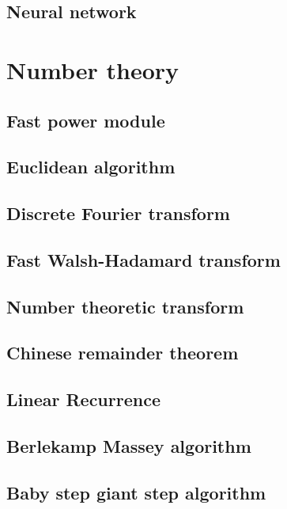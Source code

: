 \documentclass[titlepage, a4paper,10pt]{article}
\begin{document}
\begin{multicols}{2}
\begin{spacing}{0.6}
{			\subsection{Neural network}
				
		\section{Number theory}
			\subsection{Fast power module}
				
			\subsection{Euclidean algorithm}
				
			\subsection{Discrete Fourier transform}
				
			\subsection{Fast Walsh-Hadamard transform}
				
			\subsection{Number theoretic transform}
				
			\subsection{Chinese remainder theorem}
				
			\subsection{Linear Recurrence}
				
			\subsection{Berlekamp Massey algorithm}
				
			\subsection{Baby step giant step algorithm}
				
}
\end{spacing}
\end{multicols}
\end{document}
